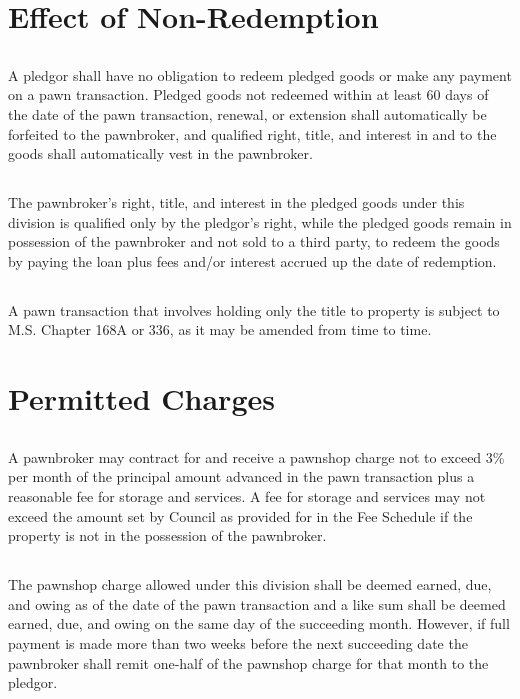 \section{Effect of Non-Redemption}
\subsection{}
A pledgor shall have no obligation to redeem pledged goods or make any payment on a pawn transaction.  Pledged goods not redeemed within at least 60 days of the date of the pawn transaction, renewal, or extension shall automatically be forfeited to the pawnbroker, and qualified right, title, and interest in and to the goods shall automatically vest in the pawnbroker.
\subsection{}
The pawnbroker’s right, title, and interest in the pledged goods under this division is qualified only by the pledgor’s right, while the pledged goods remain in possession of the pawnbroker and not sold to a third party, to redeem the goods by paying the loan plus fees and/or interest accrued up the date of redemption.
\subsection{}
A pawn transaction that involves holding only the title to property is subject to M.S. Chapter 168A or 336, as it may be amended from time to time.

\section{Permitted Charges}
\subsection{}
A pawnbroker may contract for and receive a pawnshop charge not to exceed 3\% per month of the principal amount advanced in the pawn transaction plus a reasonable fee for storage and services.  A fee for storage and services may not exceed the amount set by Council as provided for in the Fee Schedule if the property is not in the possession of the pawnbroker.
\subsection{}
The pawnshop charge allowed under this division shall be deemed earned, due, and owing as of the date of the pawn transaction and a like sum shall be deemed earned, due, and owing on the same day of the succeeding month.  However, if full payment is made more than two weeks before the next succeeding date the pawnbroker shall remit one-half of the pawnshop charge for that month to the pledgor.
